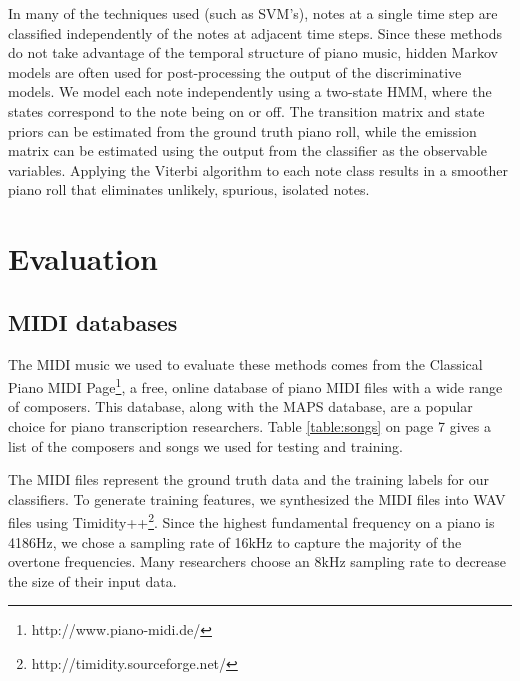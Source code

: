 \documentclass[5p]{elsarticle}
\begin{document}
In many of the techniques used (such as SVM's), notes at a single time step are classified independently of the notes at adjacent time steps. Since these methods do not take advantage of the temporal structure of piano music, hidden Markov models are often used for post-processing the output of the discriminative models. We model each note independently using a two-state HMM, where the states correspond to the note being on or off. The transition matrix and state priors can be estimated from the ground truth piano roll, while the emission matrix can be estimated using the output from the classifier as the observable variables. Applying the Viterbi algorithm to each note class results in a smoother piano roll that eliminates unlikely, spurious, isolated notes.


\section{Evaluation}

\subsection{MIDI databases}

The MIDI music we used to evaluate these methods comes from the Classical Piano MIDI Page\footnote{http://www.piano-midi.de/}, a free, online database of piano MIDI files with a wide range of composers. This database, along with the MAPS database, are a popular choice for piano transcription researchers. Table \ref{table:songs} on page 7 gives a list of the composers and songs we used for testing and training.

The MIDI files represent the ground truth data and the training labels for our classifiers. To generate training features, we synthesized the MIDI files into WAV files using Timidity++\footnote{http://timidity.sourceforge.net/}. Since the highest fundamental frequency on a piano is 4186Hz, we chose a sampling rate of 16kHz to capture the majority of the overtone frequencies. Many researchers choose an 8kHz sampling rate to decrease the size of their input data.
\end{document}
